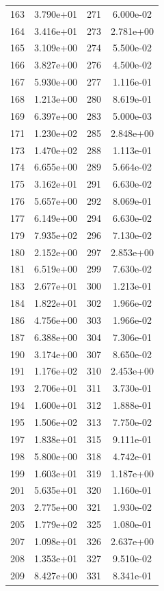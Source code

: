 \documentclass[12pt]{article}
\begin{document}
\begin{longtable}{@{}cccc@{}}
163 & 3.790e+01 & 271 & 6.000e-02 \\
164 & 3.416e+01 & 273 & 2.781e+00 \\
165 & 3.109e+00 & 274 & 5.500e-02 \\
166 & 3.827e+00 & 276 & 4.500e-02 \\
167 & 5.930e+00 & 277 & 1.116e-01 \\
168 & 1.213e+00 & 280 & 8.619e-01 \\
169 & 6.397e+00 & 283 & 5.000e-03 \\
171 & 1.230e+02 & 285 & 2.848e+00 \\
173 & 1.470e+02 & 288 & 1.113e-01 \\
174 & 6.655e+00 & 289 & 5.664e-02 \\
175 & 3.162e+01 & 291 & 6.630e-02 \\
176 & 5.657e+00 & 292 & 8.069e-01 \\
177 & 6.149e+00 & 294 & 6.630e-02 \\
179 & 7.935e+02 & 296 & 7.130e-02 \\
180 & 2.152e+00 & 297 & 2.853e+00 \\
181 & 6.519e+00 & 299 & 7.630e-02 \\
183 & 2.677e+01 & 300 & 1.213e-01 \\
184 & 1.822e+01 & 302 & 1.966e-02 \\
186 & 4.756e+00 & 303 & 1.966e-02 \\
187 & 6.388e+00 & 304 & 7.306e-01 \\
190 & 3.174e+00 & 307 & 8.650e-02 \\
191 & 1.176e+02 & 310 & 2.453e+00 \\
193 & 2.706e+01 & 311 & 3.730e-01 \\
194 & 1.600e+01 & 312 & 1.888e-01 \\
195 & 1.506e+02 & 313 & 7.750e-02 \\
197 & 1.838e+01 & 315 & 9.111e-01 \\
198 & 5.800e+00 & 318 & 4.742e-01 \\
199 & 1.603e+01 & 319 & 1.187e+00 \\
201 & 5.635e+01 & 320 & 1.160e-01 \\
203 & 2.775e+00 & 321 & 1.930e-02 \\
205 & 1.779e+02 & 325 & 1.080e-01 \\
207 & 1.098e+01 & 326 & 2.637e+00 \\
208 & 1.353e+01 & 327 & 9.510e-02 \\
209 & 8.427e+00 & 331 & 8.341e-01 \\

\end{longtable}
\end{document}
